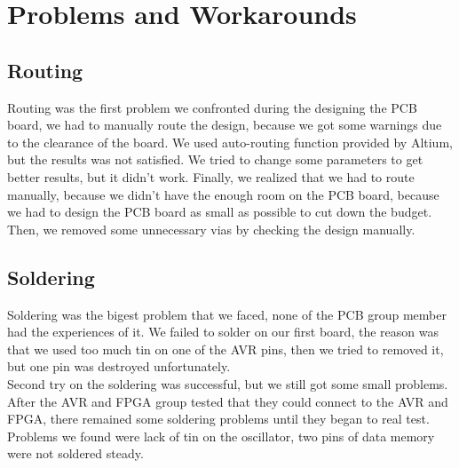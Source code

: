 \section {Problems and Workarounds}
\subsection{Routing}
Routing was the first problem we confronted during the designing the PCB board, we had to manually route the design, because we got some warnings due to the clearance of the board. We used auto-routing function provided by Altium, but the results was not satisfied. We tried to change some parameters to get better results, but it didn't work. Finally, we realized that we had to route manually, because we didn't have the enough room on the PCB board, because we had to design the PCB board as small as possible to cut down the budget. Then, we removed some unnecessary vias by checking the design manually. 
\subsection{Soldering}
Soldering was the bigest problem that we faced, none of the PCB group member had the experiences of it. We failed to solder on our first board, the reason was that we used too much tin on one of the AVR pins, then we tried to removed it, but one pin was destroyed unfortunately.\\
Second try on the soldering was successful, but we still got some small problems. After the AVR and FPGA group tested that they could connect to the AVR and FPGA, there remained some soldering problems until they began to real test. Problems we found were lack of tin on the oscillator, two pins of data memory were not soldered steady.    


